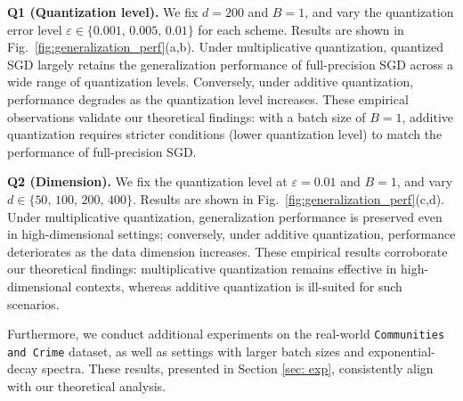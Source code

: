 \documentclass[11pt, letterpaper]{article}
\begin{document}
\noindent \textbf{Q1 (Quantization level).}
We fix $d=200$ and $B=1$, and vary the quantization error level
$\varepsilon\in\{0.001,\,0.005,\,0.01\}$ for each scheme.
Results are shown in Fig.~\ref{fig:generalization_perf}(a,b). Under multiplicative quantization, quantized SGD largely retains the generalization performance of full-precision SGD across a wide range of quantization levels. Conversely, under additive quantization, performance degrades as the quantization level increases. These empirical observations validate our theoretical findings: with a batch size of $B=1$, additive quantization requires stricter conditions (lower quantization level) to match the performance of full-precision SGD.



\noindent \textbf{Q2 (Dimension).}
We fix the quantization level at $\varepsilon=0.01$ and $B=1$,
and vary $d\in\{50,\,100,\,200,\,400\}$.
Results are shown in Fig.~\ref{fig:generalization_perf}(c,d). Under multiplicative quantization, generalization performance is preserved even in high-dimensional settings; conversely, under additive quantization, performance deteriorates as the data dimension increases. These empirical results corroborate our theoretical findings: multiplicative quantization remains effective in high-dimensional contexts, whereas additive quantization is ill-suited for such scenarios.

Furthermore, we conduct additional experiments on the real-world \texttt{Communities and Crime} dataset, as well as settings with larger batch sizes and exponential-decay spectra. These results, presented in Section \ref{sec: exp}, consistently align with our theoretical analysis.
\end{document}
